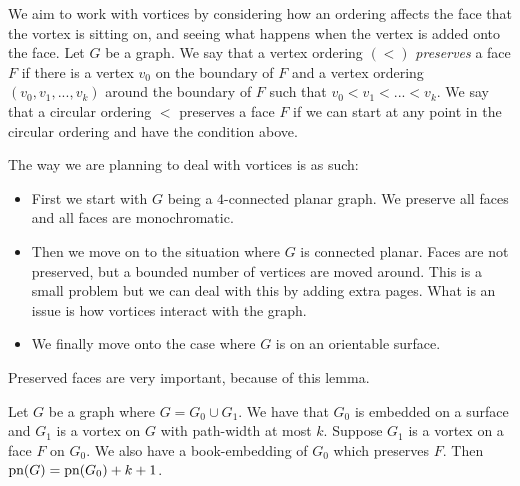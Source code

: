We aim to work with vortices by considering how an ordering affects the face that the vortex is sitting on, and seeing what happens when the vertex is added onto the face.
Let $G$ be a graph. We say that a vertex ordering $(<)$ \textit{preserves} a face $F$ if there is a vertex $v_0$ on the boundary of $F$ and a vertex ordering $(v_0, v_1, ..., v_k)$ around the boundary of $F$ such that $v_0 < v_1 < ... < v_k$. We say that a circular ordering $<$ preserves a face $F$ if we can start at any point in the circular ordering and have the condition above. 

The way we are planning to deal with vortices is as such:
\begin{itemize}
	\item First we start with $G$ being a $4$-connected planar graph. We preserve all faces and all faces are monochromatic.
	\item Then we move on to the situation where $G$ is connected planar. Faces are not preserved, but a bounded number of vertices are moved around. This is a small problem but we can deal with this by adding extra pages. What is an issue is how vortices interact with the graph. 
	\item We finally move onto the case where $G$ is on an orientable surface. 
\end{itemize}


Preserved faces are very important, because of this lemma.

\begin{lemma}\label{lem:preserved_faces_pagenumber}
	Let $G$ be a graph where $G = G_0 \cup G_1$. We have that $G_0$ is embedded on a surface and $G_1$ is a vortex on $G$ with path-width at most $k$. Suppose $G_1$ is a vortex on a face $F$ on $G_0$. We also have a book-embedding of $G_0$ which preserves $F$. Then $\text{pn}(G) = \text{pn}(G_0) + k + 1$. 
\end{lemma}

